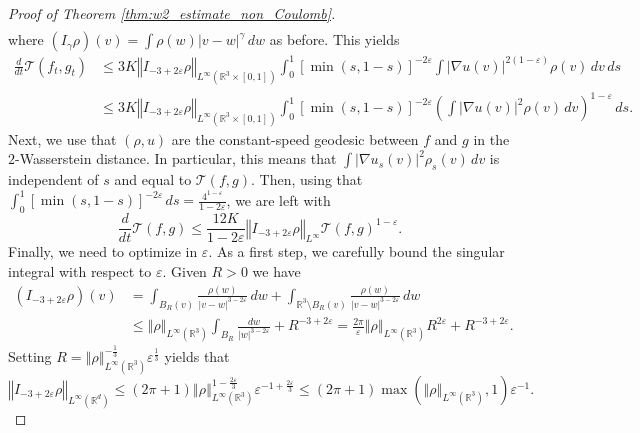 \documentclass[11pt]{amsart}
\numberwithin{equation}{section}
\begin{document}
\begin{proof}[Proof of Theorem \ref{thm:w2_estimate_non_Coulomb}]
\begin{align*}
\end{align*}
%
where $(I_\gamma\rho)(v)=\int\rho(w)\left|v-w\right|^{\gamma}\,dw$ as before. This yields
%
\begin{align*}
  \frac{d}{dt}\mathcal{T}(f_t,g_t) &
  \leq3K\left\Vert I_{-3+2\varepsilon}\rho\right\Vert _{L^{\infty}\left(\mathbb{R}^{3}\times[0,1]\right)}\int_{0}^{1}\left[\min\left(s,1-s\right)\right]^{-2\varepsilon}\int\left|\nabla u(v)\right|^{2(1-\varepsilon)}\rho(v)\,dv\,ds \\
  & \leq3K\left\Vert I_{-3+2\varepsilon}\rho\right\Vert _{L^{\infty}\left(\mathbb{R}^{3}\times[0,1]\right)}\int_{0}^{1}\left[\min\left(s,1-s\right)\right]^{-2\varepsilon}\left(\int\left|\nabla u(v)\right|^{2}\rho(v)\,dv\right)^{1-\varepsilon}\,ds.
\end{align*}
%
Next, we use that $(\rho,u)$ are the constant-speed geodesic between $f$ and $g$ in the $2$-Wasserstein distance. In particular, this means that $\int\left|\nabla u_{s}(v)\right|^{2}\rho_{s}(v)\,dv$ is independent of $s$ and equal to $\mathcal T(f,g)$. Then, using that $\int_{0}^{1}\left[\min\left(s,1-s\right)\right]^{-2\varepsilon}\,ds=\frac{4^{1-\varepsilon}}{1-2\varepsilon}$, we are left with
%
\begin{equation}\label{eq:bound_with_eps}
  \frac{d}{dt}\mathcal T(f,g)\leq\frac{12K}{1-2\varepsilon}\left\Vert I_{-3+2\varepsilon}\rho\right\Vert _{L^{\infty}}\mathcal T(f,g)^{1-\varepsilon}.
\end{equation}
%
Finally, we need to optimize in $\varepsilon$. As a first step, we carefully bound the singular integral with respect to $\varepsilon$. Given $R>0$ we have
%
\begin{align*}
  (I_{-3+2\varepsilon}\rho)(v) & =\int_{B_{R}(v)}\frac{\rho(w)}{\left|v-w\right|^{3-2\varepsilon}}\,dw+\int_{\mathbb{R}^{3}\setminus B_{R}(v)}\frac{\rho(w)}{\left|v-w\right|^{3-2\varepsilon}}\,dw	\\
  &\leq\left\Vert \rho\right\Vert _{L^{\infty}(\mathbb{R}^{3})}\int_{B_{R}}\frac{dw}{\left|w\right|^{3-2\varepsilon}}+R^{-3+2\varepsilon} =\frac{2\pi}{\varepsilon}\left\Vert \rho\right\Vert _{L^{\infty}(\mathbb{R}^{3})}R^{2\varepsilon}+R^{-3+2\varepsilon}.
\end{align*}
%
Setting $R=\left\Vert \rho\right\Vert _{L^{\infty}(\mathbb{R}^{3})}^{-\frac{1}{3}}\varepsilon^{\frac{1}{3}}$ yields that
%
\begin{equation}
  \left\Vert I_{-3+2\varepsilon}\rho\right\Vert _{L^{\infty}(\mathbb{R}^{d})}\leq\left(2\pi+1\right)\left\Vert \rho\right\Vert _{L^{\infty}(\mathbb{R}^{3})}^{1-\frac{2\varepsilon}{3}}\varepsilon^{-1+\frac{2\varepsilon}{3}}\leq\left(2\pi+1\right)\max\left(\left\Vert \rho\right\Vert _{L^{\infty}(\mathbb{R}^{3})},1\right)\varepsilon^{-1}. \label{form*}

\end{equation}
\end{proof}
\end{document}
